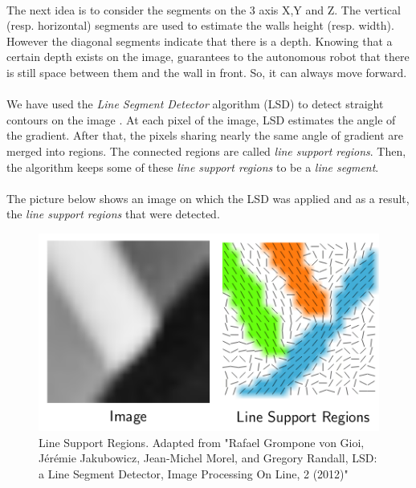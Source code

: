 \documentclass[12pt]{report}
\begin{document}
	 \paragraph{}
	 The next idea is to consider the segments on the 3 axis X,Y and Z. The vertical (resp. horizontal) segments are used to estimate the walls height (resp. width). However the diagonal segments indicate that there is a depth. Knowing that a certain depth exists on the image, guarantees to the autonomous robot that there is still space between them and the wall in front. So, it can always move forward.
	  
	  \paragraph{}
	  We have used the \textit{Line Segment Detector} algorithm (LSD) to detect straight contours on the image \cite{grompone_von_gioi_lsd:_2012}. At each pixel of the image, LSD estimates the angle of the gradient. After that, the pixels sharing nearly the same angle of gradient are merged into regions. The connected regions are called \textit{line support regions}. Then, the algorithm keeps some of these \textit{line support regions} to be a \textit{line segment}.
	  
	  \paragraph{}
	  The picture below shows an image on which the LSD was applied and as a result, the \textit{line support regions} that were detected.
	  	\begin{figure}[H]
	  	\begin{center}
	  		\includegraphics[scale=0.6]{res/lsr.png}
	  		\caption{Line Support Regions. Adapted from "Rafael Grompone von Gioi, Jérémie Jakubowicz, Jean-Michel Morel, and Gregory Randall, LSD: a Line Segment Detector, Image Processing On Line, 2 (2012)" }
	  	\end{center}
	  \end{figure}
\end{document}
